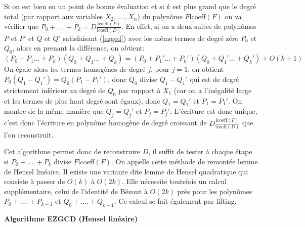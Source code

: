 \documentclass[a4paper,11pt]{article}
\begin{document}
Si on est bien en un point de bonne évaluation et si $k$ est plus grand que le
degré total (par rapport aux variables $X_2, \ldots ., X_n$) du polynôme
 $F \mbox{lcoeff} ( F )$ on va vérifier que $P_0 + \ldots . + P_k = D
\frac{\mbox{lcoeff} ( F )}{\mbox{lcoeff} ( D )}$. En effet, si on a deux
suites de polynômes $P$ et $P'$ et $Q$ et $Q'$ satisfaisant (\ref{ezgcd}) avec
les même termes de degré zéro $P_0$ et $Q_0$, alors en prenant la différence,
on obtient:
\[ ( P_0 + P_1 \ldots  + P_k ) ( Q_0 + Q_1 \ldots  + Q_k ) = ( P_0 + P_1'
   \ldots  + P_k' ) ( Q_0 + Q_1' \ldots  + Q_k' ) + O ( k + 1 ) \]
On égale alors les termes homogènes de degré $j$, pour $j = 1$, on obtient
$P_0 ( Q_1 - Q_1' ) = Q_0 ( P_1 - P_1' )$, donc $Q_0$ divise $Q_1 - Q_1'$ qui
est de degré strictement inférieur au degré de $Q_0$ par rapport à $X_1$ (car
on a l'inégalité large et les termes de plus haut degré sont égaux),
donc $Q_1 = Q_1'$ et $P_1 = P_1'$. On montre de la même manière que $Q_j =
Q_j'$ et $P_j = P_j'$. L'écriture est donc unique, c'est donc l'écriture en
polynôme homogène de degré croissant de $D \frac{\mbox{lcoeff} ( F
)}{\mbox{lcoeff} ( D )}$ que l'on reconstruit.

Cet algorithme permet donc de reconstruire $D$, il suffit de tester à chaque
étape si $P_0 + \ldots . + P_k$ divise $F \mbox{lcoeff} ( F )$. On appelle
cette méthode de remontée lemme de Hensel linéaire. Il existe une variante
dite lemme de Hensel quadratique qui consiste à passer de $O ( k )$ à $O ( 2 k
)$. Elle nécessite toutefois un calcul supplémentaire, celui de l'identité de
Bézout à $O ( 2 k )$ près pour les polynômes $P_0 + \ldots . + P_{k - 1}$ et
$Q_0 + \ldots . + Q_{k - 1}$. Ce calcul se fait également par lifting.

{\bf{Algorithme EZGCD (Hensel linéaire)}}
\end{document}
